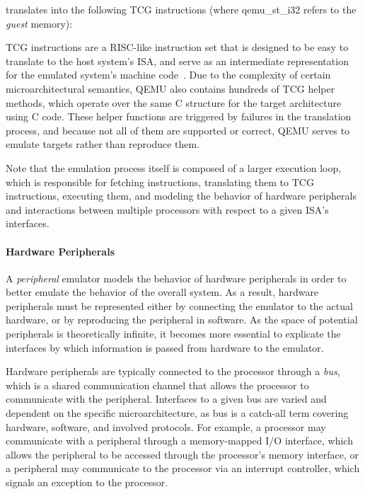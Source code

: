 \noindent
translates into the following TCG instructions (where qemu\_st\_i32 refers to the \emph{guest} memory):

\begin{center}

\end{center}

TCG instructions are a RISC-like instruction set that is designed to be easy to translate to the host system's ISA, and serve as an intermediate representation for the emulated system's machine code~\cite{tcg}.
Due to the complexity of certain microarchitectural semantics, QEMU also contains hundreds of TCG helper methods, which operate over the same C structure for the target architecture using C code.
These helper functions are triggered by failures in the translation process, and because not all of them are supported or correct, QEMU serves to emulate targets rather than reproduce them.

Note that the emulation process itself is composed of a larger execution loop, which is responsible for fetching instructions, translating them to TCG instructions, executing them, and modeling the behavior of hardware peripherals and interactions between multiple processors with respect to a given ISA's interfaces.

\paragraph{Hardware Peripherals}
\label{sec:periphs}

A \emph{peripheral} emulator models the behavior of hardware peripherals in order to better emulate the behavior of the overall system.
As a result, hardware peripherals must be represented either by connecting the emulator to the actual hardware, or by reproducing the peripheral in software.
As the space of potential peripherals is theoretically infinite, it becomes more essential to explicate the interfaces by which information is passed from hardware to the emulator.

Hardware peripherals are typically connected to the processor through a \emph{bus}, which is a shared communication channel that allows the processor to communicate with the peripheral.
Interfaces to a given bus are varied and dependent on the specific microarchitecture, as bus is a catch-all term covering hardware, software, and involved protocols.
For example, a processor may communicate with a peripheral through a memory-mapped I/O interface, which allows the peripheral to be accessed through the processor's memory interface, or a peripheral may communicate to the processor via an interrupt controller, which signals an exception to the processor.

